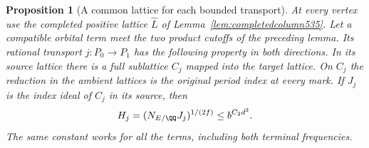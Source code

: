 \documentclass[a4paper,11pt]{article}
\newtheorem{proposition}{Proposition}[section]
\theoremstyle{definition}
\theoremstyle{remark}
\numberwithin{equation}{section}
\begin{document}
\begin{proposition}[A common lattice for each bounded transport]
\leavevmode\label{prop:matchedtransports629}
At every vertex use the completed positive lattice
\(\widehat L\) of Lemma~\ref{lem:completedcolumn535}.
Let a compatible orbital term meet the two product cutoffs of the
preceding lemma. Its rational transport \(j:P_0\to P_1\) has the
following property in both directions. In its source lattice there
is a full sublattice \(C_j\) mapped into the target lattice. On
\(C_j\) the reduction in the ambient lattices is the original
period index at every mark. If \(J_j\) is the index ideal of
\(C_j\) in its source, then
\[
               H_j=(N_{E/\QQ}J_j)^{1/(2f)}
                            \le b^{C_2d^2}.
\]
The same constant works for all the terms, including both terminal
frequencies.
\end{proposition}
\end{document}
